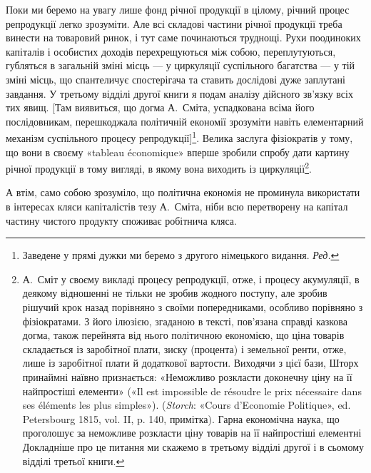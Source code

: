 Поки ми беремо на увагу лише фонд річної продукції в цілому,
річний процес репродукції легко зрозуміти. Але всі складові
частини річної продукції треба винести на товаровий ринок, і
тут саме починаються труднощі. Рухи поодиноких капіталів і
особистих доходів перехрещуються між собою, переплутуються,
губляться в загальній зміні місць — у циркуляції суспільного
багатства — у тій зміні місць, що спантеличує спостерігача та
ставить дослідові дуже заплутані завдання. У третьому відділі
другої книги я подам аналізу дійсного зв’язку всіх тих явищ.
[Там виявиться, що догма А.~Сміта, успадкована всіма його послідовникам,
перешкоджала політичній економії зрозуміти навіть
елементарний механізм суспільного процесу репродукції]\footnote*{
Заведене у прямі дужки ми беремо з другого німецького видання.
\emph{Ред.}
}. Велика
заслуга фізіократів у тому, що вони в своєму «tableau économique»
вперше зробили спробу дати картину річної продукції
в тому вигляді, в якому вона виходить із циркуляції\footnote{
А.~Сміт у своєму викладі процесу репродукції, отже, і процесу
акумуляції, в деякому відношенні не тільки не зробив жодного поступу,
але зробив рішучий крок назад порівняно з своїми попередниками, особливо
порівняно з фізіократами. З його ілюзією, згаданою в тексті, пов’язана
справді казкова догма, також перейнята від нього політичною економією,
що ціна товарів складається із заробітної плати, зиску (процента)
і земельної ренти, отже, лише із заробітної плати й додаткової вартости.
Виходячи з цієї бази, Шторх принаймні наївно признається: «Неможливо
розкласти доконечну ціну на її найпростіші елементи» («Il est
impossible de résoudre le prix nécessaire dans ses éléments les plus simples»).
(\emph{Storch}: «Cours d’Economie Politique», ed. Petersbourg 1815,
vol. II, p. 140, примітка). Гарна економічна наука, що проголошує за
неможливе розкласти ціну товарів на її найпростіші елементні Докладніше
про це питання ми скажемо в третьому відділі другої і в сьомому
відділі третьої книги.
}.

А втім, само собою зрозуміло, що політична економія не проминула
використати в інтересах кляси капіталістів тезу А.~Сміта,
ніби всю перетворену на капітал частину чистого продукту споживає
робітнича кляса.
